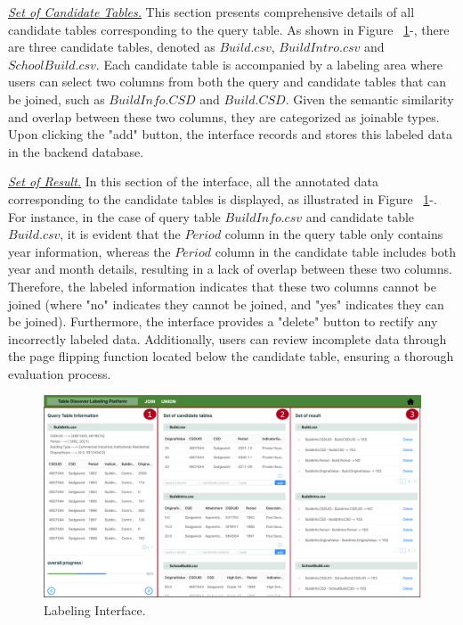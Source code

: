 \noindent \underline{\textit{Set of Candidate Tables.}} This section presents comprehensive details of all candidate tables corresponding to the query table. As shown in Figure ~\ref{fig:interface}-, there are three candidate tables, denoted as $Build.csv$, $BuildIntro.csv$ and $SchoolBuild.csv$. Each candidate table is accompanied by a labeling area where users can select two columns from both the query and candidate tables that can be joined, such as $BuildInfo.CSD$ and $Build.CSD$. Given the semantic similarity and overlap between these two columns, they are categorized as joinable types. Upon clicking the "add" button, the interface records and stores this labeled data in the backend database.

\noindent \underline{\textit{Set of Result.}} In this section of the interface, all the annotated data corresponding to the candidate tables is displayed, as illustrated in Figure ~\ref{fig:interface}-. For instance, in the case of query table $BuildInfo.csv$ and candidate table $Build.csv$, it is evident that the $Period$ column in the query table only contains year information, whereas the  $Period$ column in the candidate table includes both year and month details, resulting in a lack of overlap between these two columns. Therefore, the labeled information indicates that these two columns cannot be joined (where "no" indicates they cannot be joined, and "yes" indicates they can be joined).
Furthermore, the interface provides a "delete" button to rectify any incorrectly labeled data. Additionally, users can review incomplete data through the page flipping function located below the candidate table, ensuring a thorough evaluation process.




\begin{figure}[h]
	\centering
	\includegraphics[width=1.0\linewidth]{fig/interface.pdf}
	\caption{Labeling Interface.}
	\label{fig:interface}
\end{figure}

